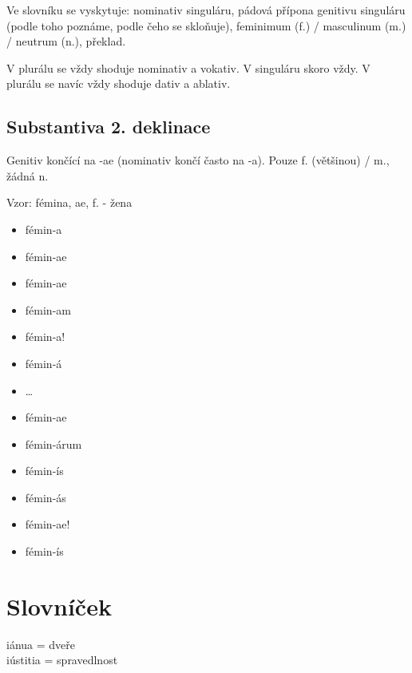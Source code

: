 \documentclass[12pt]{article}					%
\begin{document}
        Ve slovníku se vyskytuje: nominativ singuláru, pádová přípona genitivu singuláru (podle toho poznáme, podle čeho se skloňuje), feminimum (f.) / masculinum (m.) / neutrum (n.), překlad.

        V plurálu se vždy shoduje nominativ a vokativ. V singuláru skoro vždy. V plurálu se navíc vždy shoduje dativ a ablativ.

    \subsection{Substantiva 2. deklinace}
        Genitiv končící na -ae (nominativ končí často na -a). Pouze f. (většinou) / m., žádná n.

        Vzor: fémina, ae, f. - žena
        \begin{itemize}
            \item fémin-a
            \item fémin-ae
            \item fémin-ae
            \item fémin-am
            \item fémin-a!
            \item fémin-á
            \item …
            \item fémin-ae
            \item fémin-árum
            \item fémin-ís
            \item fémin-ás
            \item fémin-ae!
            \item fémin-ís
        \end{itemize}


    















\newpage
\section{Slovníček}
    iánua = dveře\\
    iústitia = spravedlnost\\
\end{document}
